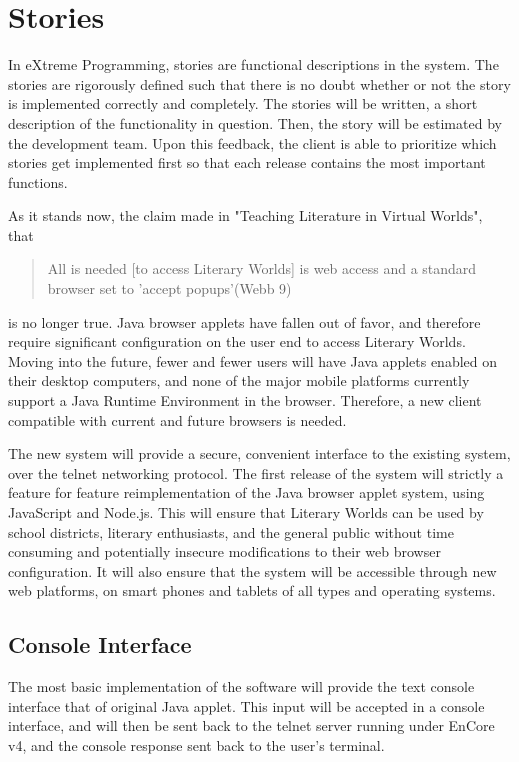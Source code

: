 \documentclass[12pt, letterpaper]{report}
\begin{document}
	
	
	\chapter{Stories}
	\par
	In eXtreme Programming, stories are functional descriptions in the system. The stories are rigorously defined such that there is no doubt whether or not the story is implemented correctly and completely. The stories will be written, a short description of the functionality in question. Then, the story will be estimated by the development team. Upon this feedback, the client is able to prioritize which stories get implemented first so that each release contains the most important functions.
	
	\par
	As it stands now, the claim made in "Teaching Literature in Virtual Worlds", that 
	
	\begin{quotation}
    All is needed [to access Literary Worlds] is web access and a standard browser set to 'accept popups'(Webb 9)
	\end{quotation}
	is no longer true. Java browser applets have fallen out of favor, and therefore require significant configuration on the user end to access Literary Worlds. Moving into the future, fewer and fewer users will have Java applets enabled on their desktop computers, and none of the major mobile platforms currently support a Java Runtime Environment in the browser. Therefore, a new client compatible with current and future browsers is needed.
	
	\par
	The new system will provide a secure, convenient interface to the existing system, over the telnet networking protocol. The first release of the system will strictly a feature for feature reimplementation of the Java browser applet system, using JavaScript and Node.js. This will ensure that Literary Worlds can be used by school districts, literary enthusiasts, and the general public without time consuming and potentially insecure modifications to their web browser configuration. It will also ensure that the system will be accessible through new web platforms, on smart phones and tablets of all types and operating systems.
	
	\section{Console Interface}
	The most basic implementation of the software will provide the text console interface that of original Java applet. This input will be accepted in a console interface, and will then be sent back to the telnet server running under EnCore v4, and the console response sent back to the user's terminal.
	
\end{document}

